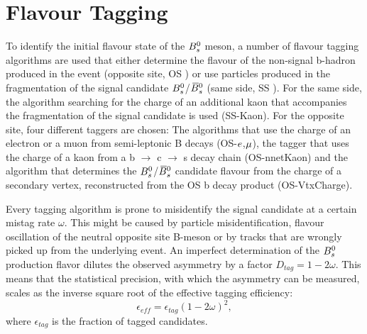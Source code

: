 \clearpage
\section{Flavour Tagging}
\label{sec:Tagging}

To identify the initial flavour state of the ${{B}^0_{s}}$ meson,
a number of flavour tagging algorithms are used that either determine the flavour of the non-signal b-hadron produced in the event (opposite site, OS \cite{LHCb-PAPER-2011-027})
or use particles produced in the fragmentation of the signal candidate ${{B}^0_{s}}$/${{\kern 0.18em\overline{\kern -0.18em B}{}}{}^0_{s}}$ (same side, SS \cite{Aaij:2016psi}). 
For the same side, the algorithm searching for the charge of an additional kaon that accompanies the fragmentation of the signal candidate is used (SS-Kaon). 
For the opposite site, four different taggers are chosen: 
The algorithms that use the charge of an electron or a muon from semi-leptonic B decays (OS-${e}$,${\mu}$), the tagger that uses the charge of a kaon from a b $\to$ c $\to$ s decay chain (OS-nnetKaon) 
and the algorithm that determines the ${{B}^0_{s}}$/${{\kern 0.18em\overline{\kern -0.18em B}{}}{}^0_{s}}$ candidate flavour from the charge of a secondary vertex, reconstructed from the OS b decay product (OS-VtxCharge). 

Every tagging algorithm is prone to misidentify the signal candidate at a certain mistag rate $\omega$. %
This might be caused by particle misidentification, flavour oscillation of the neutral opposite site B-meson or by tracks that are wrongly picked up from the underlying event. 
An imperfect determination of the ${{B}^0_{s}}$ production 
flavor dilutes the observed \CP asymmetry by a factor $D_{tag} = 1 - 2\omega$.
This means that the statistical precision, with which the \CP asymmetry can be measured, scales as the inverse square root of the effective tagging efficiency:
\begin{equation}
\label{eq: taggingEfficiency}
\epsilon_{eff} = \epsilon_{tag}(1 - 2\omega)^{2},
\end{equation}
where $\epsilon_{tag}$ is the fraction of tagged candidates. 

